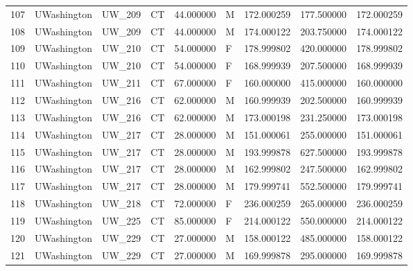 \begin{tabular}{llllrlrrr}
107    &     UWashington &       UW\_209 &                 CT &  44.000000 &        M &       172.000259 &    177.500000 &  172.000259 \\
108    &     UWashington &       UW\_209 &                 CT &  44.000000 &        M &       174.000122 &    203.750000 &  174.000122 \\
109    &     UWashington &       UW\_210 &                 CT &  54.000000 &        F &       178.999802 &    420.000000 &  178.999802 \\
110    &     UWashington &       UW\_210 &                 CT &  54.000000 &        F &       168.999939 &    207.500000 &  168.999939 \\
111    &     UWashington &       UW\_211 &                 CT &  67.000000 &        F &       160.000000 &    415.000000 &  160.000000 \\
112    &     UWashington &       UW\_216 &                 CT &  62.000000 &        M &       160.999939 &    202.500000 &  160.999939 \\
113    &     UWashington &       UW\_216 &                 CT &  62.000000 &        M &       173.000198 &    231.250000 &  173.000198 \\
114    &     UWashington &       UW\_217 &                 CT &  28.000000 &        M &       151.000061 &    255.000000 &  151.000061 \\
115    &     UWashington &       UW\_217 &                 CT &  28.000000 &        M &       193.999878 &    627.500000 &  193.999878 \\
116    &     UWashington &       UW\_217 &                 CT &  28.000000 &        M &       162.999802 &    247.500000 &  162.999802 \\
117    &     UWashington &       UW\_217 &                 CT &  28.000000 &        M &       179.999741 &    552.500000 &  179.999741 \\
118    &     UWashington &       UW\_218 &                 CT &  72.000000 &        F &       236.000259 &    265.000000 &  236.000259 \\
119    &     UWashington &       UW\_225 &                 CT &  85.000000 &        F &       214.000122 &    550.000000 &  214.000122 \\
120    &     UWashington &       UW\_229 &                 CT &  27.000000 &        M &       158.000122 &    485.000000 &  158.000122 \\
121    &     UWashington &       UW\_229 &                 CT &  27.000000 &        M &       169.999878 &    295.000000 &  169.999878 \\

\end{tabular}
